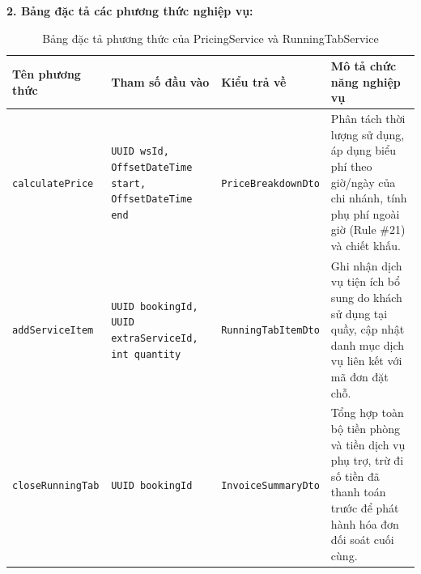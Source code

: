 \noindent\textbf{2. Bảng đặc tả các phương thức nghiệp vụ:}

\begin{table}[H]
\centering
\caption{Bảng đặc tả phương thức của PricingService và RunningTabService}
\label{tab:spec-pricing-runningtab}
\renewcommand{\arraystretch}{1.3}
\begin{tabular}{|p{3.8cm}|p{3.5cm}|p{2.5cm}|p{5.2cm}|}
\hline
\textbf{Tên phương thức} & \textbf{Tham số đầu vào} & \textbf{Kiểu trả về} & \textbf{Mô tả chức năng nghiệp vụ} \\
\hline
\texttt{calculatePrice} & \texttt{UUID wsId, OffsetDateTime start, OffsetDateTime end} & \texttt{PriceBreakdownDto} & Phân tách thời lượng sử dụng, áp dụng biểu phí theo giờ/ngày của chi nhánh, tính phụ phí ngoài giờ (Rule \#21) và chiết khấu. \\
\hline
\texttt{addServiceItem} & \texttt{UUID bookingId, UUID extraServiceId, int quantity} & \texttt{RunningTabItemDto} & Ghi nhận dịch vụ tiện ích bổ sung do khách sử dụng tại quầy, cập nhật danh mục dịch vụ liên kết với mã đơn đặt chỗ. \\
\hline
\texttt{closeRunningTab} & \texttt{UUID bookingId} & \texttt{InvoiceSummaryDto} & Tổng hợp toàn bộ tiền phòng và tiền dịch vụ phụ trợ, trừ đi số tiền đã thanh toán trước để phát hành hóa đơn đối soát cuối cùng. \\
\hline
\end{tabular}
\end{table}

